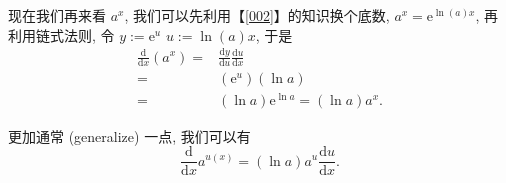 \begin{tcolorbox}[size=fbox, breakable, enhanced jigsaw, title={指数函数}]
现在我们再来看 $a^x$, 我们可以先利用【\ref{002}】的知识换个底数,
$a^x=\mathrm{e}^{\ln(a)x}$, 再利用链式法则, 令 $y:=\mathrm{e}^u$
$u:=\ln{(a)}x$, 于是
\begin{align*}
\frac{\mathrm{d}}{\mathrm{d}x}(a^x)=&\frac{\mathrm{d}y}{\mathrm{d}u}\frac{\mathrm{d}u}{\mathrm{d}x}\\
=&(\mathrm{e}^u)(\ln{a})\\
=&(\ln{a})\mathrm{e}^{\ln{a}}=(\ln{a})a^x.
\end{align*}

更加通常 (generalize) 一点, 我们可以有
\begin{equation*}
\boxed{\frac{\mathrm{d}}{\mathrm{d}x}a^{u(x)}=(\ln{a})a^u\frac{\mathrm{d}u}{\mathrm{d}x}}.
\end{equation*}

\end{tcolorbox}

